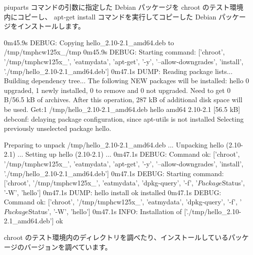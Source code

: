 \documentclass[mingoth,a4paper]{jsarticle}
\begin{document}
piuparts コマンドの引数に指定した Debian パッケージを chroot のテスト環境内にコピーし、
apt-get install コマンドを実行してコピーした Debian パッケージをインストールします。

\begin{commandline}
0m45.9s DEBUG: Copying hello_2.10-2.1_amd64.deb to /tmp/tmphcw125x_/tmp
0m45.9s DEBUG: Starting command: ['chroot', '/tmp/tmphcw125x_', 'eatmydata', 'apt-get', '-y',
'--allow-downgrades', 'install', './tmp/hello_2.10-2.1_amd64.deb']
0m47.1s DUMP:
  Reading package lists...
  Building dependency tree...
  The following NEW packages will be installed:
    hello
  0 upgraded, 1 newly installed, 0 to remove and 0 not upgraded.
  Need to get 0 B/56.5 kB of archives.
  After this operation, 287 kB of additional disk space will be used.
  Get:1 /tmp/hello_2.10-2.1_amd64.deb hello amd64 2.10-2.1 [56.5 kB]
  debconf: delaying package configuration, since apt-utils is not installed
  Selecting previously unselected package hello.

  Preparing to unpack /tmp/hello_2.10-2.1_amd64.deb ...
  Unpacking hello (2.10-2.1) ...
  Setting up hello (2.10-2.1) ...
0m47.1s DEBUG: Command ok: ['chroot', '/tmp/tmphcw125x_', 'eatmydata', 'apt-get', '-y',
'--allow-downgrades', 'install', './tmp/hello_2.10-2.1_amd64.deb']
0m47.1s DEBUG: Starting command: ['chroot', '/tmp/tmphcw125x_', 'eatmydata', 'dpkg-query',
'-f', '${Package} ${Status}\n', '-W', 'hello']
0m47.1s DUMP:
  hello install ok installed
0m47.1s DEBUG: Command ok: ['chroot', '/tmp/tmphcw125x_', 'eatmydata', 'dpkg-query',
'-f', '${Package} ${Status}\n', '-W', 'hello']
0m47.1s INFO: Installation of ['./tmp/hello_2.10-2.1_amd64.deb'] ok
\end{commandline}

chroot のテスト環境内のディレクトリを調べたり、インストールしているパッケージのバージョンを調べています。
\end{document}

